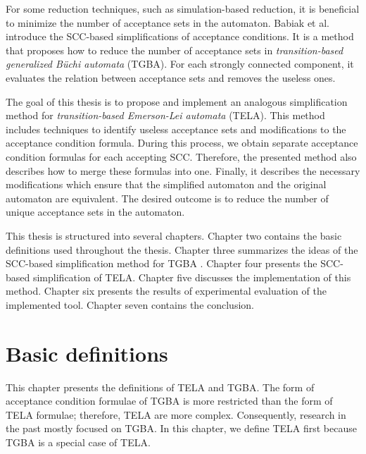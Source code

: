 \documentclass[
  digital, %
  twoside, %
  table,   %
  lof,     %
  lot,     %
]{fithesis3}
\begin{document}
For some reduction techniques, such as simulation-based reduction, it is beneficial to minimize the number of acceptance sets in the automaton. Babiak et al. \cite{spin2013} introduce the SCC-based simplifications of acceptance conditions. It is a method that proposes how to reduce the number of acceptance sets in \emph{transition-based generalized Büchi automata} (TGBA). For each strongly connected component, it evaluates the relation between acceptance sets and removes the useless ones. 

The goal of this thesis is to propose and implement an analogous simplification method for \emph{transition-based Emerson-Lei automata} (TELA). This method includes techniques to identify useless acceptance sets and modifications to the acceptance condition formula. During this process, we obtain separate acceptance condition formulas for each accepting SCC. Therefore, the presented method also describes how to merge these formulas into one. Finally, it describes the necessary modifications which ensure that the simplified automaton and the original automaton are equivalent. The desired outcome is to reduce the number of unique acceptance sets in the automaton. 

This thesis is structured into several chapters. Chapter two contains the basic definitions used throughout the thesis. Chapter three summarizes the ideas of the SCC-based simplification method for TGBA \cite{spin2013}. Chapter four presents the SCC-based simplification of TELA. Chapter five discusses the implementation of this method. Chapter six presents the results of experimental evaluation of the implemented tool. Chapter seven contains the conclusion. 

\chapter{Basic definitions}
\label{chap:basic_definitions}
This chapter presents the definitions of TELA and TGBA. The form of acceptance condition formulae of TGBA is more restricted than the form of TELA formulae; therefore, TELA are more complex. Consequently, research in the past mostly focused on TGBA.  In this chapter, we define TELA first because TGBA is a special case of TELA.
\end{document}
